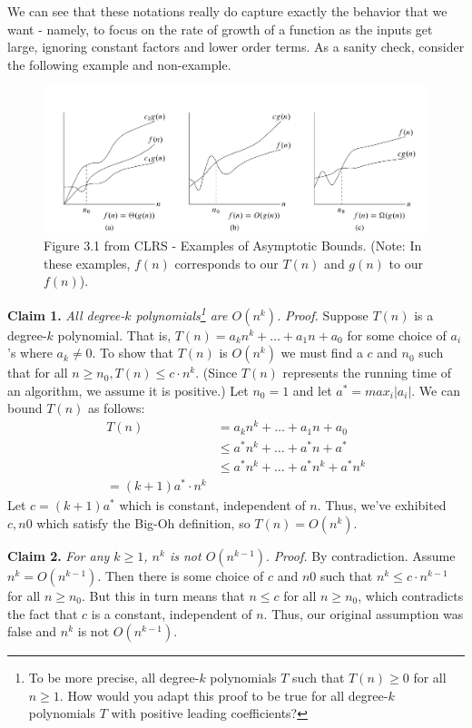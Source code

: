 \documentclass [12pt]{article}
\begin{document}
We can see that these notations really do capture exactly the behavior that we want - namely, to focus on the rate of growth of a function as the inputs get large, ignoring constant factors and lower order terms. As a sanity check, consider the following example and non-example.

\begin{figure}[ht!]
\centering
\includegraphics[scale=0.4]{asymptotics.png}
\caption{Figure 3.1 from CLRS - Examples of Asymptotic Bounds. (Note: In these examples, $f(n)$ corresponds to our $T(n)$ and $g(n)$ to our $f(n)$).}
\label{fig:example}
\end{figure}

\textbf{Claim 1.} \textit{All degree-$k$ polynomials\footnote{To be more precise, all degree-$k$ polynomials $T$ such that $T(n) \geq 0$ for all $n \geq 1$. How would you adapt this proof to be true for all degree-$k$ polynomials $T$ with positive leading coefficients?} are $O(n^k)$.}
\textit{Proof.} Suppose $T(n)$ is a degree-$k$ polynomial. That is, $T(n) = a_k n^
k + \dots + a_1n + a_0$ for some choice of $a_i$'s where $a_k \neq 0$. To show that $T(n)$ is $O(n^k)$ we must find a $c$ and $n_0$ such that for all $n \geq n_0, T(n) \leq c \cdot n^k$. (Since $T(n)$ represents the running time of an algorithm, we assume it is positive.) Let $n_0 = 1$ and let $a^* = max_i|a_i|$. We can bound $T(n)$ as follows:
\begin{align*}
T(n) &= a_kn^k + \dots + a_1n + a_0 \\
&\leq a^*n^k + \dots + a^*n + a^* \\
&\leq a^*n^k + \dots + a^*n^k + a^*n^k \\
= (k+1)a^*\cdot n^k
\end{align*}
Let $c = (k+1)a^*$ which is constant, independent of $n$. Thus, we've exhibited $c, n0$ which satisfy the Big-Oh definition, so $T(n) = O(n^k)$.

\textbf{Claim 2.} \textit{For any $k \geq 1$, $n^k$ is not $O(n^{k-1})$}.
\textit{Proof.} By contradiction. Assume $n^k = O(n^{k-1})$. Then there is some choice of $c$ and $n0$ such that $n^k \leq c \cdot n^{k-1}$ for all $n \geq n_0$. But this in turn means that $n \leq c$ for all $n \geq n_0$, which contradicts the fact that $c$ is a constant, independent of $n$. Thus, our original assumption was false and $n^k$
is not $O(n^{k-1})$.
\end{document}
